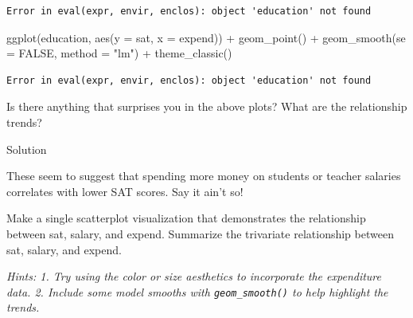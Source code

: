 \documentclass[
  letterpaper,
  DIV=11,
  numbers=noendperiod]{scrreprt}
\newenvironment{Shaded}{\begin{snugshade}}{\end{snugshade}}
\newcommand{\AttributeTok}[1]{\textcolor[rgb]{0.40,0.45,0.13}{#1}}
\newcommand{\ConstantTok}[1]{\textcolor[rgb]{0.56,0.35,0.01}{#1}}
\newcommand{\FunctionTok}[1]{\textcolor[rgb]{0.28,0.35,0.67}{#1}}
\newcommand{\NormalTok}[1]{\textcolor[rgb]{0.00,0.23,0.31}{#1}}
\newcommand{\SpecialCharTok}[1]{\textcolor[rgb]{0.37,0.37,0.37}{#1}}
\newcommand{\StringTok}[1]{\textcolor[rgb]{0.13,0.47,0.30}{#1}}
\begin{document}
\begin{verbatim}
Error in eval(expr, envir, enclos): object 'education' not found
\end{verbatim}

\begin{Shaded}
\begin{Highlighting}[]
\FunctionTok{ggplot}\NormalTok{(education, }\FunctionTok{aes}\NormalTok{(}\AttributeTok{y =}\NormalTok{ sat, }\AttributeTok{x =}\NormalTok{ expend)) }\SpecialCharTok{+}
  \FunctionTok{geom\_point}\NormalTok{() }\SpecialCharTok{+}
  \FunctionTok{geom\_smooth}\NormalTok{(}\AttributeTok{se =} \ConstantTok{FALSE}\NormalTok{, }\AttributeTok{method =} \StringTok{"lm"}\NormalTok{) }\SpecialCharTok{+} 
  \FunctionTok{theme\_classic}\NormalTok{()}
\end{Highlighting}
\end{Shaded}

\begin{verbatim}
Error in eval(expr, envir, enclos): object 'education' not found
\end{verbatim}

\begin{Shaded}
\begin{Highlighting}[]
\NormalTok{Is there anything that surprises you in the above plots? What are the relationship trends?}
\end{Highlighting}
\end{Shaded}

Solution

These seem to suggest that spending more money on students or teacher
salaries correlates with lower SAT scores. Say it ain't so!

\hfill\break

\begin{Shaded}
\begin{Highlighting}[]
\NormalTok{Make a single scatterplot visualization that demonstrates the relationship between \textasciigrave{}sat\textasciigrave{}, \textasciigrave{}salary\textasciigrave{}, and \textasciigrave{}expend\textasciigrave{}. Summarize the trivariate relationship between \textasciigrave{}sat\textasciigrave{}, \textasciigrave{}salary\textasciigrave{}, and \textasciigrave{}expend\textasciigrave{}. }
\end{Highlighting}
\end{Shaded}

\emph{Hints: 1. Try using the color or size aesthetics to incorporate
the expenditure data. 2. Include some model smooths with
\texttt{geom\_smooth()} to help highlight the trends.}
\end{document}
